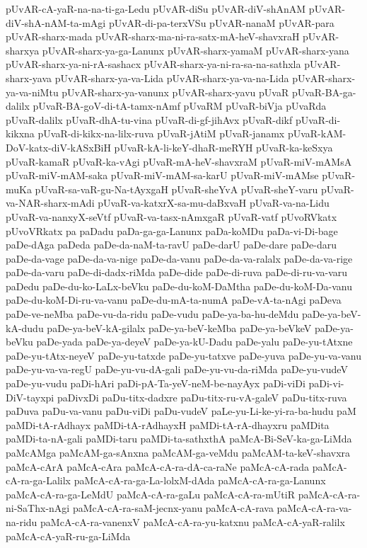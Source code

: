 {pUvAR-cA-yaR-na-na-ti-ga-Ledu
pUvAR-diSu
pUvAR-diV-shAnAM
pUvAR-diV-shA-nAM-ta-mAgi
pUvAR-di-pa-terxVSu
pUvAR-nanaM
pUvAR-para
pUvAR-sharx-mada
pUvAR-sharx-ma-ni-ra-satx-mA-heV-shavxraH
pUvAR-sharxya
pUvAR-sharx-ya-ga-Lanunx
pUvAR-sharx-yamaM
pUvAR-sharx-yana
pUvAR-sharx-ya-ni-rA-sashacx
pUvAR-sharx-ya-ni-ra-sa-na-sathxla
pUvAR-sharx-yava
pUvAR-sharx-ya-va-Lida
pUvAR-sharx-ya-va-na-Lida
pUvAR-sharx-ya-va-niMtu
pUvAR-sharx-ya-vanunx
pUvAR-sharx-yavu
pUvaR
pUvaR-BA-ga-dalilx
pUvaR-BA-goV-di-tA-tamx-nAmf
pUvaRM
pUvaR-biVja
pUvaRda
pUvaR-dalilx
pUvaR-dhA-tu-vina
pUvaR-di-gf-jihAvx
pUvaR-dikf
pUvaR-di-kikxna
pUvaR-di-kikx-na-lilx-ruva
pUvaR-jAtiM
pUvaR-janamx
pUvaR-kAM-DoV-katx-diV-kASxBiH
pUvaR-kA-li-keY-dhaR-meRYH
pUvaR-ka-keSxya
pUvaR-kamaR
pUvaR-ka-vAgi
pUvaR-mA-heV-shavxraM
pUvaR-miV-mAMsA
pUvaR-miV-mAM-saka
pUvaR-miV-mAM-sa-karU
pUvaR-miV-mAMse
pUvaR-muKa
pUvaR-sa-vaR-gu-Na-tAyxgaH
pUvaR-sheYvA
pUvaR-sheY-varu
pUvaR-va-NAR-sharx-mAdi
pUvaR-va-katxrX-sa-mu-daBxvaH
pUvaR-va-na-Lidu
pUvaR-va-nanxyX-seVtf
pUvaR-va-tasx-nAmxgaR
pUvaR-vatf
pUvoRVkatx
pUvoVRkatx
pa
paDadu
paDa-ga-ga-Lanunx
paDa-koMDu
paDa-vi-Di-bage
paDe-dAga
paDeda
paDe-da-naM-ta-ravU
paDe-darU
paDe-dare
paDe-daru
paDe-da-vage
paDe-da-va-nige
paDe-da-vanu
paDe-da-va-ralalx
paDe-da-va-rige
paDe-da-varu
paDe-di-dadx-riMda
paDe-dide
paDe-di-ruva
paDe-di-ru-va-varu
paDedu
paDe-du-ko-LaLx-beVku
paDe-du-koM-DaMtha
paDe-du-koM-Da-vanu
paDe-du-koM-Di-ru-va-vanu
paDe-du-mA-ta-numA
paDe-vA-ta-nAgi
paDeva
paDe-ve-neMba
paDe-vu-da-ridu
paDe-vudu
paDe-ya-ba-hu-deMdu
paDe-ya-beV-kA-dudu
paDe-ya-beV-kA-gilalx
paDe-ya-beV-keMba
paDe-ya-beVkeV
paDe-ya-beVku
paDe-yada
paDe-ya-deyeV
paDe-ya-kU-Dadu
paDe-yalu
paDe-yu-tAtxne
paDe-yu-tAtx-neyeV
paDe-yu-tatxde
paDe-yu-tatxve
paDe-yuva
paDe-yu-va-vanu
paDe-yu-va-va-regU
paDe-yu-vu-dA-gali
paDe-yu-vu-da-riMda
paDe-yu-vudeV
paDe-yu-vudu
paDi-hAri
paDi-pA-Ta-yeV-neM-be-nayAyx
paDi-viDi
paDi-vi-DiV-tayxpi
paDivxDi
paDu-titx-dadxre
paDu-titx-ru-vA-galeV
paDu-titx-ruva
paDuva
paDu-va-vanu
paDu-viDi
paDu-vudeV
paLe-yu-Li-ke-yi-ra-ba-hudu
paM
paMDi-tA-rAdhayx
paMDi-tA-rAdhayxH
paMDi-tA-rA-dhayxru
paMDita
paMDi-ta-nA-gali
paMDi-taru
paMDi-ta-sathxthA
paMcA-Bi-SeV-ka-ga-LiMda
paMcAMga
paMcAM-ga-sAnxna
paMcAM-ga-veMdu
paMcAM-ta-keV-shavxra
paMcA-cArA
paMcA-cAra
paMcA-cA-ra-dA-ca-raNe
paMcA-cA-rada
paMcA-cA-ra-ga-Lalilx
paMcA-cA-ra-ga-La-lolxM-dAda
paMcA-cA-ra-ga-Lanunx
paMcA-cA-ra-ga-LeMdU
paMcA-cA-ra-gaLu
paMcA-cA-ra-mUtiR
paMcA-cA-ra-ni-SaThx-nAgi
paMcA-cA-ra-saM-jecnx-yanu
paMcA-cA-rava
paMcA-cA-ra-va-na-ridu
paMcA-cA-ra-vanenxV
paMcA-cA-ra-yu-katxnu
paMcA-cA-yaR-ralilx
paMcA-cA-yaR-ru-ga-LiMda
}
